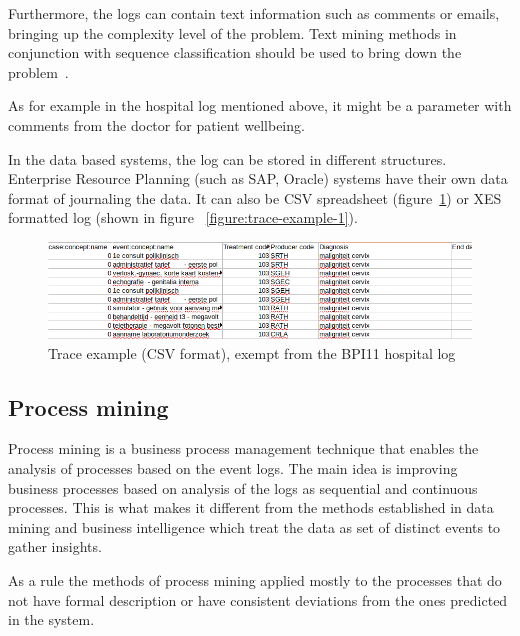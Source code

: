 Furthermore, the logs can contain text information such as comments or emails, bringing up the complexity level of the problem. Text mining methods in conjunction with sequence classification should be used to bring down the problem~\cite{DBLP:conf/bpm/TeinemaaDMF16}.

As for example in the hospital log mentioned above, it might be a parameter with comments from the doctor for patient wellbeing. 

In the data based systems, the log can be stored in different structures. Enterprise Resource Planning (such as SAP, Oracle) systems have their own data format of journaling the data. It can also be CSV spreadsheet (figure~\ref{figure:trace-example-2_csv}) or XES formatted log (shown in figure ~\ref{figure:trace-example-1}).  

\begin{figure}[!ht]
	\begin{center}  
		\includegraphics[width=\textwidth]{4_event_example_csv.png}
		\caption{Trace example (CSV format), exempt from the BPI11 hospital log~\cite{bpichallenge2011}}
		\label{figure:trace-example-2_csv}	
	\end{center}
\end{figure}



\subsection{Process mining}


Process mining is a business process management technique that enables the analysis of processes based on the event logs. The main idea is improving business processes based on analysis of the logs as sequential and continuous processes. This is what makes it different from the methods established in data mining and business intelligence which treat the data as set of distinct events to gather insights. 

As a rule the methods of process mining applied mostly to the processes that do not have formal description or have consistent deviations from the ones predicted in the system. 

